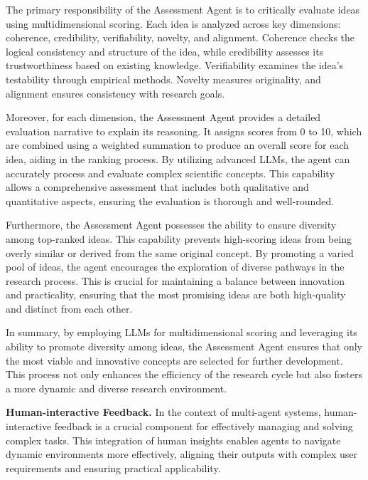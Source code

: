 The primary responsibility of the Assessment Agent is to critically evaluate ideas using multidimensional scoring. Each idea is analyzed across key dimensions: coherence, credibility, verifiability, novelty, and alignment. Coherence checks the logical consistency and structure of the idea, while credibility assesses its trustworthiness based on existing knowledge. Verifiability examines the idea's testability through empirical methods. Novelty measures originality, and alignment ensures consistency with research goals.

Moreover, for each dimension, the Assessment Agent provides a detailed evaluation narrative to explain its reasoning. It assigns scores from 0 to 10, which are combined using a weighted summation to produce an overall score for each idea, aiding in the ranking process. By utilizing advanced LLMs, the agent can accurately process and evaluate complex scientific concepts. This capability allows a comprehensive assessment that includes both qualitative and quantitative aspects, ensuring the evaluation is thorough and well-rounded.

Furthermore, the Assessment Agent possesses the ability to ensure diversity among top-ranked ideas. This capability prevents high-scoring ideas from being overly similar or derived from the same original concept. By promoting a varied pool of ideas, the agent encourages the exploration of diverse pathways in the research process. This is crucial for maintaining a balance between innovation and practicality, ensuring that the most promising ideas are both high-quality and distinct from each other.

In summary, by employing LLMs for multidimensional scoring and leveraging its ability to promote diversity among ideas, the Assessment Agent ensures that only the most viable and innovative concepts are selected for further development. This process not only enhances the efficiency of the research cycle but also fosters a more dynamic and diverse research environment.

\noindent \textbf{Human-interactive Feedback.}
\label{sec:human_feedback}
In the context of multi-agent systems, human-interactive feedback is a crucial component for effectively managing and solving complex tasks. This integration of human insights enables agents to navigate dynamic environments more effectively, aligning their outputs with complex user requirements and ensuring practical applicability. 

